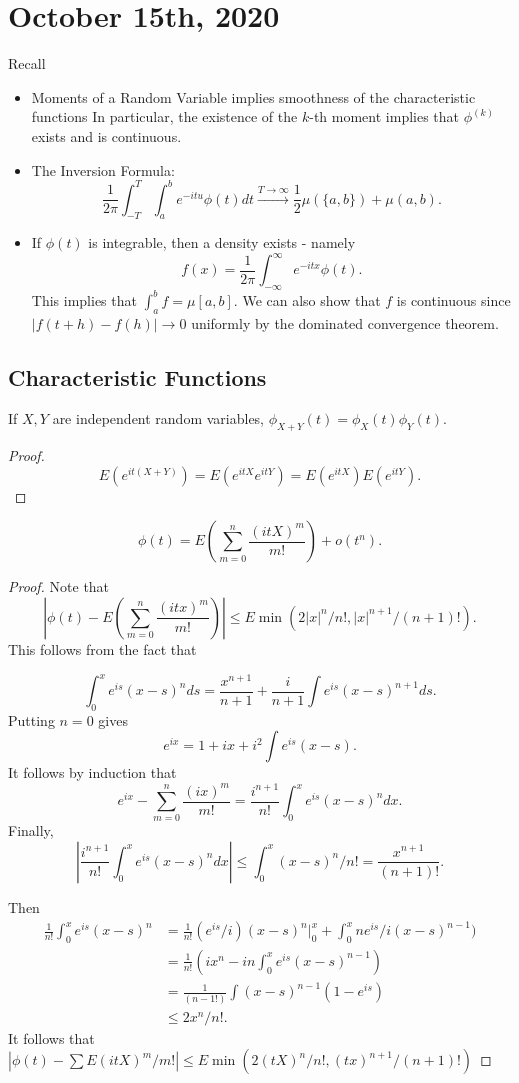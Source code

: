 \documentclass[11pt]{scrartcl}
\begin{document}
\section{October 15th, 2020}
Recall
\begin{itemize}
\item Moments of a Random Variable implies smoothness of the characteristic functions In particular, the existence of the $k$-th moment implies that $\phi^{(k)}$ exists and is continuous.
\item The Inversion Formula: $$\frac{1}{2\pi}\int_{-T}^T\int_{a}^b e^{-itu} \phi(t)dt \xrightarrow{T \to \infty} \frac{1}{2}\mu(\{a, b\}) + \mu(a, b).$$
\item If $\phi(t)$ is integrable, then a density exists - namely
$$f(x) = \frac{1}{2\pi} \int_{-\infty}^{\infty} e^{-itx}\phi(t).$$
This implies that $\int_{a}^b f = \mu[a, b]$.  We can also show that $f$ is continuous since $|f(t+h) - f(h)| \rightarrow 0$ uniformly by the dominated convergence theorem.
\end{itemize}
\subsection{Characteristic Functions}
\begin{proposition}
If $X, Y$ are independent random variables, $\phi_{X+Y}(t) = \phi_X(t) \phi_Y(t)$.
\end{proposition}
\begin{proof}
$$E(e^{it(X+Y)}) = E(e^{itX}e^{itY}) = E(e^{itX})E(e^{itY}).$$
\end{proof}
\begin{proposition}
$$\phi(t) = E\left(\sum_{m=0}^n \frac{(itX)^m}{m!}\right) + o(t^n).$$
\end{proposition}
\begin{proof}
Note that 
$$\left |\phi(t) - E\left(\sum_{m=0}^n \frac{(itx)^m}{m!}\right)\right | \le E\min(2|x|^n/n!, |x|^{n+1}/(n+1)!).$$
This follows from the fact that 

$$\int_{0}^x e^{is}(x-s)^n ds = \frac{x^{n+1}}{n+1} + \frac{i}{n+1}\int e^{is}(x-s)^{n+1}ds.$$
Putting $n=0$ gives 
$$e^{ix} = 1 + ix + i^2 \int e^{is}(x-s).$$
It follows by induction that 
$$e^{ix} - \sum_{m=0}^{n}\frac{(ix)^m}{m!} = \frac{i^{n+1}}{n!}\int_{0}^x e^{is}(x-s)^n dx.$$
Finally, 
$$\left |\frac{i^{n+1}}{n!}\int_{0}^x e^{is}(x-s)^n dx \right|\le \int_{0}^x (x-s)^n/n! = \frac{x^{n+1}}{(n+1)!}.$$

Then 
\begin{align*}
\frac{1}{n!} \int_{0}^x e^{is}(x-s)^n &= \frac{1}{n!}(e^{is}/i)(x-s)^n|_{0}^x + \int_{0}^x ne^{is}/i(x-s)^{n-1})\\
&= \frac{1}{n!}(ix^n - in\int_0^x e^{is}(x-s)^{n-1})\\
&= \frac{1}{(n-1!)}\int(x-s)^{n-1}(1-e^{is}) \\
&\le 2x^n/n!.
\end{align*}
It follows that $|\phi(t) - \sum E(itX)^m/m!| \le E \min(2(tX)^n/n!, (tx)^{n+1}/(n+1)!)$
\end{proof}
\end{document}

